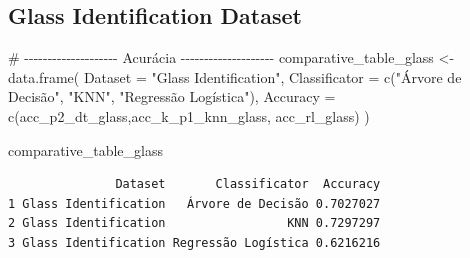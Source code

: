 \documentclass[
  letterpaper,
  DIV=11,
  numbers=noendperiod]{scrartcl}
\newenvironment{Shaded}{\begin{snugshade}}{\end{snugshade}}
\newcommand{\AttributeTok}[1]{\textcolor[rgb]{0.40,0.45,0.13}{#1}}
\newcommand{\CommentTok}[1]{\textcolor[rgb]{0.37,0.37,0.37}{#1}}
\newcommand{\FunctionTok}[1]{\textcolor[rgb]{0.28,0.35,0.67}{#1}}
\newcommand{\NormalTok}[1]{\textcolor[rgb]{0.00,0.23,0.31}{#1}}
\newcommand{\OtherTok}[1]{\textcolor[rgb]{0.00,0.23,0.31}{#1}}
\newcommand{\StringTok}[1]{\textcolor[rgb]{0.13,0.47,0.30}{#1}}
\begin{document}
\subsection{Glass Identification
Dataset}\label{glass-identification-dataset-2}

\begin{Shaded}
\begin{Highlighting}[]
\CommentTok{\# {-}{-}{-}{-}{-}{-}{-}{-}{-}{-}{-}{-}{-}{-}{-}{-}{-}{-}{-}{-} Acurácia {-}{-}{-}{-}{-}{-}{-}{-}{-}{-}{-}{-}{-}{-}{-}{-}{-}{-}{-}{-}}
\NormalTok{comparative\_table\_glass }\OtherTok{\textless{}{-}} \FunctionTok{data.frame}\NormalTok{(}
  \AttributeTok{Dataset =} \StringTok{"Glass Identification"}\NormalTok{,}
  \AttributeTok{Classificator =} \FunctionTok{c}\NormalTok{(}\StringTok{"Árvore de Decisão"}\NormalTok{, }\StringTok{"KNN"}\NormalTok{, }\StringTok{"Regressão Logística"}\NormalTok{),}
  \AttributeTok{Accuracy =} \FunctionTok{c}\NormalTok{(acc\_p2\_dt\_glass,acc\_k\_p1\_knn\_glass, acc\_rl\_glass)}
\NormalTok{)}

\NormalTok{comparative\_table\_glass}
\end{Highlighting}
\end{Shaded}

\begin{verbatim}
               Dataset       Classificator  Accuracy
1 Glass Identification   Árvore de Decisão 0.7027027
2 Glass Identification                 KNN 0.7297297
3 Glass Identification Regressão Logística 0.6216216
\end{verbatim}
\end{document}
